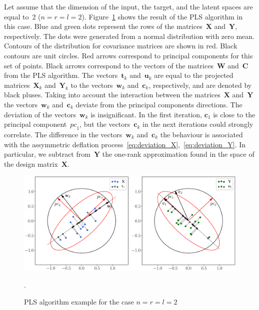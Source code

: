 \documentclass[12pt,oneside]{article}
\theoremstyle{definition}
\newcommand{\bw}{\mathbf{w}}
\newcommand{\bY}{\mathbf{Y}}
\newcommand{\bX}{\mathbf{X}}
\newcommand{\bu}{\mathbf{u}}
\newcommand{\bt}{\mathbf{t}}
\newcommand{\bc}{\mathbf{c}}
\newcommand{\bC}{\mathbf{C}}
\newcommand{\bW}{\mathbf{W}}
\begin{document}
Let assume that the dimension of the input, the target, and the latent spaces are equal to~2 ($n = r = l = 2$).
Figure~\ref{fig:PLSFigure} shows the result of the PLS algorithm in this case.
Blue and green dots represent the rows of the matrices~$\bX$ and~$\bY$, respectively. 
The dots were generated from a normal distribution with zero mean. 
Contours of the distribution for covariance matrices are shown in red.
Black contours are unit circles. 
Red arrows correspond to principal components for this set of points. 
Black arrows correspond to the vectors of the matrices~$\bW$ and~$\bC$ from the PLS algorithm. 
The vectors~$\bt_k$ and~$\bu_k$ are equal to the projected matrices~$\bX_k$ and~$\bY_k$ to the vectors~$\bw_k$ and~$\bc_k$, respectively, and are denoted by black pluses. 
Taking into account the interaction between the matrices~$\bX$ and~$\bY$ the vectors~$\bw_k$ and~$\bc_k$ deviate from the principal components directions. 
The deviation of the vectors~$\bw_k$ is insignificant. 
In the first iteration, $\bc_1$ is close to the principal component~$\textit{pc}_1$, but the vectors~$\bc_k$ in the next iterations could strongly correlate. 
The difference in the vectors~$\bw_k$ and~$\bc_k$ the behaviour is associated with the assymmetric deflation process~\eqref{eq:deviation_X},~\eqref{eq:deviation_Y}. In particular, we subtract from~$\bY$ the one-rank approximation found in the space of the design matrix~$\bX$.
\begin{figure}[h]
	\centering
	\includegraphics[width=\linewidth]{figs/PLSFigure.eps}
	\caption{PLS algorithm example for the case $n = r = l = 2$}.
	\label{fig:PLSFigure}
\end{figure}
\end{document}
